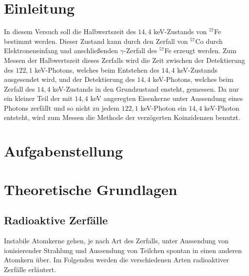 \documentclass[12pt]{article}
\title{\vspace{0cm}{\Huge Fortgeschrittenen-Praktikum I:\\ \vspace{1cm} Kurze Halbwertszeiten}}
\author{Saskia Bondza\\Simon Stephan}
\date{Durchgeführt am 02.09.2016 und 05.09.2016}
\begin{document}
\maketitle
\newpage

\thispagestyle{empty}
\tableofcontents
\newpage

\section{Einleitung}

In diesem Versuch soll die Halbwertszeit des $14,4$ keV-Zustands von $^{57}$Fe bestimmt werden. Dieser Zustand kann durch den Zerfall von $^{57}$Co durch Elektroneneinfang und anschließenden $\gamma$-Zerfall des $^{57}$Fe erzeugt werden. Zum Messen der Halbwertszeit dieses Zerfalls wird die Zeit zwischen der Detektierung des $122,1$ keV-Photons, welches beim Entstehen des $14,4$ keV-Zustands ausgesendet wird, und der Detektierung des $14,4$ keV-Photons, welches beim Zerfall des $14,4$ keV-Zustands in den Grundzustand ensteht, gemessen. Da nur ein kleiner Teil der mit $14,4$ keV angeregten Eisenkerne unter Aussendung eines Photons zerfällt und so nicht zu jedem $122,1$ keV-Photon ein $14,4$ keV-Photon entsteht, wird zum Messen die Methode der verzögerten Koinzidenzen benutzt.



\newpage
\section[Aufgabenstellung]{Aufgabenstellung}%






\newpage
\section{Theoretische Grundlagen}
\subsection{Radioaktive Zerfälle}
Instabile Atomkerne gehen, je nach Art des Zerfalls, unter Aussendung von ionisierender Strahlung und Aussendung von Teilchen spontan in einen anderen Atomkern über. Im Folgenden werden die verschiedenen Arten radioaktiver Zerfälle erläutert.
\end{document}
